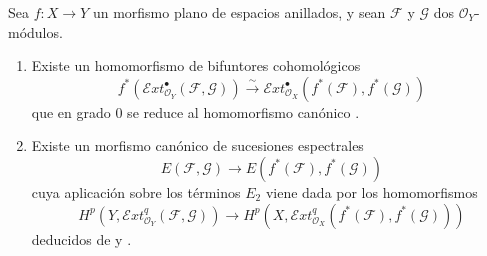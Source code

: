 \begin{proposition}[12.3.4]
\label{0.12.3.4}
\label{0.12.3.4-fr}
Sea $f:X\to Y$ un morfismo \textup{plano} de espacios anillados, y sean
$\mathcal F$ y $\mathcal G$ dos $\mathcal O_Y$-módulos.
\begin{enumerate}
  \item[\rm(i)] Existe un homomorfismo de bifuntores cohomológicos
  \[
\label{0.12.3.4.1-fr}
\tag{12.3.4.1}
f^*(\mathcal{E}xt_{\mathcal O_Y}^{\bullet}(\mathcal F,\mathcal G))
\xrightarrow{\sim}
\mathcal{E}xt_{\mathcal O_X}^{\bullet}(f^*(\mathcal F),f^*(\mathcal G))
\]
  que en grado $0$ se reduce al homomorfismo canónico
  .

  \item[\rm(ii)] Existe un morfismo canónico de sucesiones espectrales
  \[
\label{0.12.3.4.2-fr}
\tag{12.3.4.2}
E(\mathcal F,\mathcal G)\longrightarrow
E(f^*(\mathcal F),f^*(\mathcal G))
\]
  cuya aplicación sobre los términos $E_2$ viene dada por los homomorfismos
  \[
\label{0.12.3.4.3-fr}
\tag{12.3.4.3}
H^p(Y,\mathcal{E}xt_{\mathcal O_Y}^q(\mathcal F,\mathcal G))
\longrightarrow
H^p(X,\mathcal{E}xt_{\mathcal O_X}^q(f^*(\mathcal F),f^*(\mathcal G)))
\]
  deducidos de  y .
\end{enumerate}
\end{proposition}

